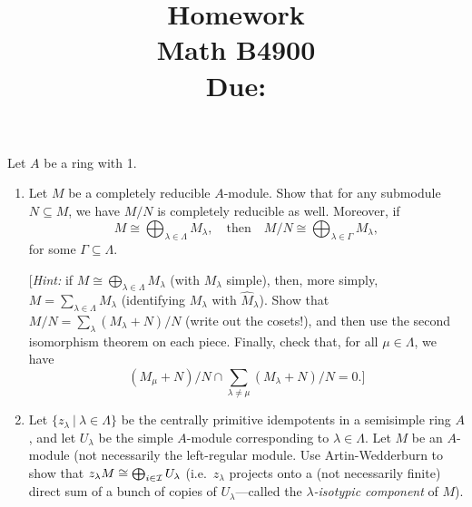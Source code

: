 \documentclass[11pt, reqno]{amsart}
\title[Homework \HW]{Homework \HW \\
Math B4900\\
\small Due: \DUE}
\author{}
\theoremstyle{plain}
\theoremstyle{definition}
\theoremstyle{example}
\def\HW{9}
\def\DUE{4/30/2021}
\begin{document}
\maketitle %


Let $A$ be a ring with 1.
\begin{enumerate}[1.]
\item Let $M$ be a completely reducible $A$-module. Show that for any submodule $N \subseteq M$, we have $M/N$ is completely reducible as well. Moreover, if 
$$M \cong \bigoplus_{\lambda \in \Lambda}M_\lambda, \quad \text{then} \quad 
	M/N \cong \bigoplus_{\lambda \in \Gamma}M_\lambda,$$
	for some $\Gamma \subseteq \Lambda$.

{[\emph{Hint:} if $M \cong \bigoplus_{\lambda \in \Lambda}M_\lambda$ (with $M_\lambda$ simple), then, more simply, $M = \sum_{\lambda \in \Lambda} M_\lambda$ (identifying $M_\lambda$ with $\hat{M}_\lambda$). Show that $M/N = \sum_\lambda (M_\lambda + N)/N$ (write out the cosets!), and then use the second isomorphism theorem on each piece. Finally, check that, for all $\mu \in \Lambda$, we have 
$$(M_\mu +N)/N \cap \sum_{\lambda \neq \mu} (M_\lambda + N)/N = 0.]$$}

\item Let $\{z_\lambda ~|~ \lambda \in \Lambda\}$ be the centrally primitive idempotents in a semisimple ring $A$, and let $U_\lambda$ be the simple $A$-module corresponding to $\lambda \in \Lambda$. Let $M$ be an $A$-module (not necessarily the left-regular module. Use Artin-Wedderburn to show that $z_\lambda M \cong \bigoplus_{i \in \mathcal{I}} U_\lambda$ (i.e.\ $z_\lambda$ projects onto a (not necessarily finite) direct sum of a bunch of copies of $U_\lambda$---called the \emph{$\lambda$-isotypic component} of $M$). 


\end{enumerate}
\end{document}

